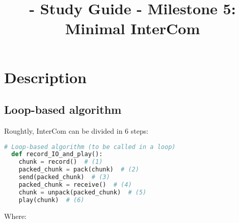 
\title{\TM{} - Study Guide - Milestone 5: Minimal InterCom}

\maketitle

\section{Description}

\subsection{Loop-based algorithm}

Roughtly, InterCom can be divided in 6 steps:

\begin{lstlisting}[language=Python]
  # Loop-based algorithm (to be called in a loop)
  def record_IO_and_play():
    chunk = record()  # (1)
    packed_chunk = pack(chunk)  # (2)
    send(packed_chunk)  # (3)
    packed_chunk = receive()  # (4)
    chunk = unpack(packed_chunk)  # (5)
    play(chunk)  # (6)
\end{lstlisting}


Where:


